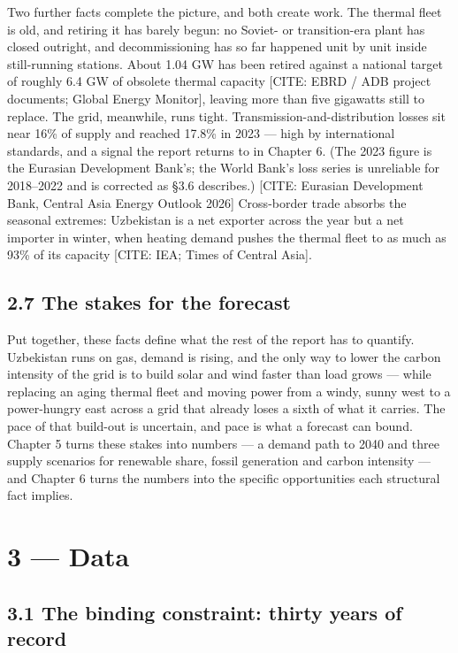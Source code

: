 \documentclass[10pt,twocolumn]{article}
\newcommand{\mk}[1]{{\color{amber}\small #1}}
\begin{document}
Two further facts complete the picture, and both create work. The thermal fleet is old, and retiring it has barely begun: no Soviet- or transition-era plant has closed outright, and decommissioning has so far happened unit by unit inside still-running stations. About 1.04 GW has been retired against a national target of roughly 6.4 GW of obsolete thermal capacity \mk{[CITE: EBRD / ADB project documents; Global Energy Monitor]}, leaving more than five gigawatts still to replace. The grid, meanwhile, runs tight. Transmission-and-distribution losses sit near 16\% of supply and reached 17.8\% in 2023 --- high by international standards, and a signal the report returns to in Chapter 6. (The 2023 figure is the Eurasian Development Bank's; the World Bank's loss series is unreliable for 2018--2022 and is corrected as \S{}3.6 describes.) \mk{[CITE: Eurasian Development Bank, Central Asia Energy Outlook 2026]} Cross-border trade absorbs the seasonal extremes: Uzbekistan is a net exporter across the year but a net importer in winter, when heating demand pushes the thermal fleet to as much as 93\% of its capacity \mk{[CITE: IEA; Times of Central Asia]}.

\subsection*{2.7 The stakes for the forecast}

Put together, these facts define what the rest of the report has to quantify. Uzbekistan runs on gas, demand is rising, and the only way to lower the carbon intensity of the grid is to build solar and wind faster than load grows --- while replacing an aging thermal fleet and moving power from a windy, sunny west to a power-hungry east across a grid that already loses a sixth of what it carries. The pace of that build-out is uncertain, and pace is what a forecast can bound. Chapter 5 turns these stakes into numbers --- a demand path to 2040 and three supply scenarios for renewable share, fossil generation and carbon intensity --- and Chapter 6 turns the numbers into the specific opportunities each structural fact implies.

\section*{3 --- Data}

\subsection*{3.1 The binding constraint: thirty years of record}
\end{document}
